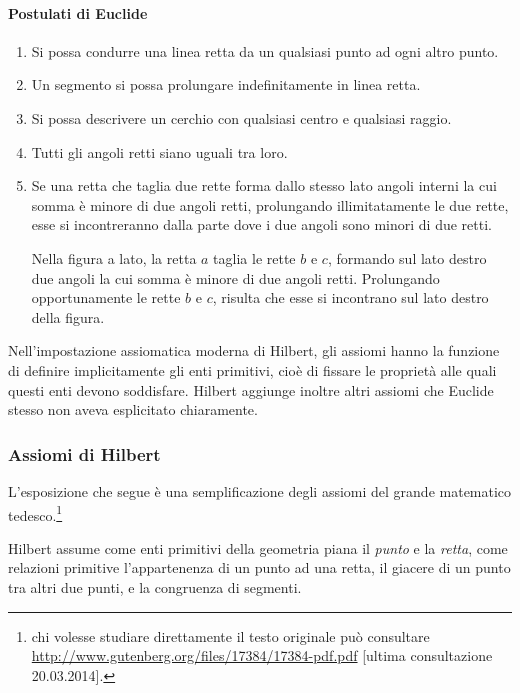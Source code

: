 \paragraph{Postulati di Euclide}
\begin{enumerate}[label=\Roman{*}.]
\item Si possa condurre una linea retta da un qualsiasi punto ad ogni 
altro punto.
\item Un segmento si possa prolungare indefinitamente in linea retta.
\item Si possa descrivere un cerchio con qualsiasi centro e qualsiasi 
raggio.
\item Tutti gli angoli retti siano uguali tra loro.
\item Se una retta che taglia due rette forma dallo stesso lato 
angoli interni la cui somma è minore di due angoli retti, prolungando 
illimitatamente le due rette, esse si incontreranno dalla parte dove 
i due angoli sono minori di due retti.

\begin{minipage}{.49\textwidth}
\centering
\end{minipage}\hfil
\begin{minipage}{.45\textwidth}
Nella figura a lato, la retta $a$ taglia le rette $b$ e $c$, formando 
sul lato destro due angoli la cui somma è minore di due angoli retti. 
Prolungando opportunamente le rette $b$ e $c$, risulta che esse si 
incontrano sul lato destro della figura.
\end{minipage}
\end{enumerate}

Nell'impostazione assiomatica moderna di Hilbert, gli assiomi hanno 
la funzione di definire implicitamente gli enti primitivi, cioè di 
fissare le proprietà alle quali questi enti devono soddisfare. 
Hilbert aggiunge inoltre altri assiomi che Euclide stesso non aveva 
esplicitato chiaramente.

\subsubsection*{Assiomi di Hilbert}\label{sect:ass_Hilbert}

L'esposizione che segue è una semplificazione degli assiomi del 
grande matematico tedesco.\footnote{chi volesse studiare direttamente 
il testo originale può consultare 
\url{http://www.gutenberg.org/files/17384/17384-pdf.pdf} [ultima 
consultazione 20.03.2014].}

Hilbert assume come enti primitivi della geometria piana il 
\emph{punto} e la \emph{retta}, come relazioni primitive 
l'appartenenza di un punto ad una retta, il giacere di un punto tra 
altri due punti, e la congruenza di segmenti.

